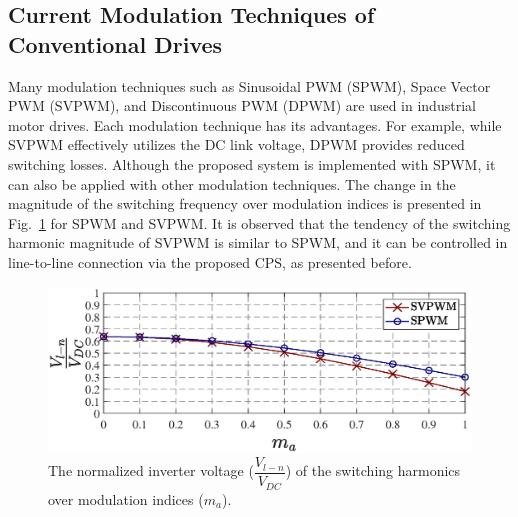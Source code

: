 \documentclass[journal]{IEEEtran}
\begin{document}
\subsection{Current Modulation Techniques of Conventional Drives}
Many modulation techniques such as Sinusoidal PWM (SPWM), Space Vector PWM (SVPWM), and Discontinuous PWM (DPWM) are used in industrial motor drives.
Each modulation technique has its advantages.
For example, while SVPWM effectively utilizes the DC link voltage, DPWM provides reduced switching losses. 
Although the proposed system is implemented with SPWM, it can also be applied with other modulation techniques.
The change in the magnitude of the switching frequency over modulation indices is presented in Fig.~\ref{fig:SVPWM} for SPWM and SVPWM. 
It is observed that the tendency of the switching harmonic magnitude of SVPWM is similar to SPWM, and it can be controlled in line-to-line connection via the proposed CPS, as presented before.   
\begin{figure}[h!]
    \centering
    \includegraphics[width=1\linewidth]{SVPWM3.eps}
    \caption{The normalized inverter voltage ($\dfrac{V_{l-n}}{V_{DC}}$) of the switching harmonics over modulation indices ($m_a$).}
    \label{fig:SVPWM}
\end{figure}

\vspace*{-6mm}
\end{document}
